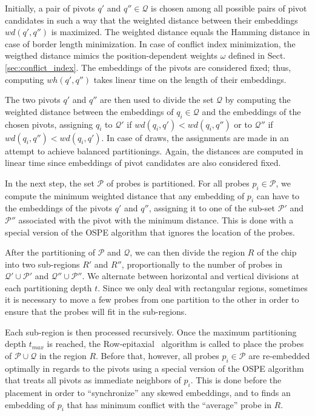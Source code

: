 \documentclass[runningheads]{llncs}
\begin{document}
Initially, a pair of pivots $q'$ and $q'' \in \mathcal{Q}$ is chosen among all
possible pairs of pivot candidates in such a way that the weighted distance between
their embeddings $wd(q', q'')$ is maximized. The weighted distance equals the
Hamming distance in case of border length minimization. In case of conflict index
minimization, the weigthed distance mimics the position-dependent weights $\omega$
defined in Sect.\,\ref{sec:conflict_index}. The embeddings of the pivots are
considered fixed; thus, computing $wh(q', q'')$ takes linear time on the length
of their embeddings.

The two pivots $q'$ and $q''$ are then used to divide the set $\mathcal{Q}$
by computing the weighted distance between the embeddings of $q_i \in \mathcal{Q}$
and the embeddings of the chosen pivots, assigning $q_i$ to $\mathcal{Q}'$ if
$wd(q_i, q') < wd(q_i, q'')$ or to $\mathcal{Q}''$ if $wd(q_i, q'') < wd(q_i, q')$.
In case of draws, the assignments are made in an attempt to
achieve balanced partitionings. Again, the distances are computed in linear time
since embeddings of pivot candidates are also considered fixed.

In the next step, the set $\mathcal{P}$ of probes is partitioned. For all probes
$p_i \in \mathcal{P}$, we compute the minimum weighted distance that any embedding
of $p_i$ can have to the embeddings of the pivots $q'$ and $q''$, assigning it to
one of the sub-set $\mathcal{P}'$ and $\mathcal{P}''$ associated with the pivot
with the minimum distance. This is done with a special version of the OSPE algorithm
that ignores the location of the probes.

After the partitioning of $\mathcal{P}$ and $\mathcal{Q}$, we can then divide the
region $R$ of the chip into two sub-regions $R'$ and $R''$, proportionally to the
number of probes in $\mathcal{Q}' \cup \mathcal{P}'$ and $\mathcal{Q}'' \cup \mathcal{P}''$.
We alternate between horizontal and vertical divisions at each partitioning depth $t$.
Since we only deal with rectangular regions, sometimes it is necessary to move
a few probes from one partition to the other in order to ensure that the probes
will fit in the sub-regions.

Each sub-region is then processed recursively. Once the maximum partitioning depth
$t_{max}$ is reached, the Row-epitaxial~\cite{KAHNG03A} algorithm is
called to place the probes of $\mathcal{P} \cup \mathcal{Q}$ in the region $R$.
Before that, however, all probes $p_i \in \mathcal{P}$ are re-embedded optimally
in regards to the pivots using a special version of the OSPE algorithm that treats
all pivots as immediate neighbors of $p_i$. This is done before the placement in
order to ``synchronize'' any skewed embeddings, and to finds an embedding of
$p_i$ that has minimum conflict with the ``average'' probe in $R$.
\end{document}
